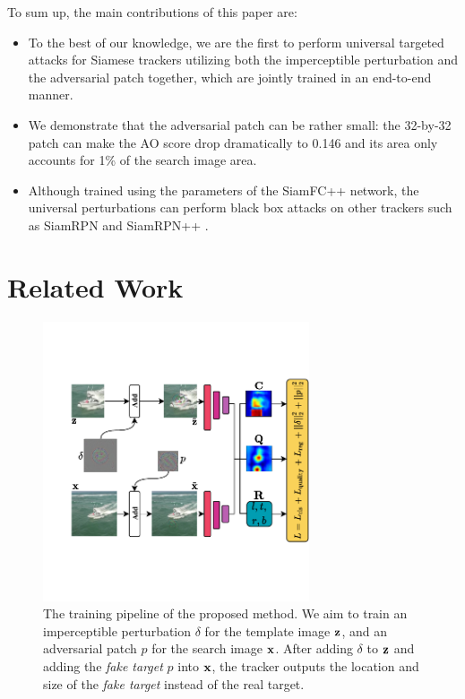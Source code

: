 \documentclass[journal]{IEEEtran}
\begin{document}
To sum up, the main contributions of this paper are:
\begin{itemize}
  \item To the best of our knowledge, we are the first to perform universal targeted attacks for Siamese trackers utilizing both the imperceptible perturbation and the adversarial patch together, which are jointly trained in an end-to-end manner.
  \item We demonstrate that the adversarial patch can be rather small: the 32-by-32 patch can make the AO score drop dramatically to 0.146 and its area only accounts for 1\% of the search image area.
  \item Although trained using the parameters of the SiamFC++ \cite{SiamFC++} network, the universal perturbations can perform black box attacks on other trackers such as SiamRPN \cite{SiamRPN} and SiamRPN++ \cite{SiamRPN++}.
\end{itemize}

\section{Related Work}

\begin{figure}[t]
  \centering
  \includegraphics[width=0.7\textwidth]{images_imperceptible/network_v5.pdf}
  \caption{The training pipeline of the proposed method. We aim to train an imperceptible perturbation $\delta$ for the template image $\textbf z$, and an adversarial patch $p$ for the search image $\textbf x$. After adding $\delta$ to $\textbf z$ and adding the \textit{fake target} $p$ into $\textbf x$, the tracker outputs the location and size of the \textit{fake target} instead of the real target.}
  \label{fig:net}
\end{figure}
\end{document}
